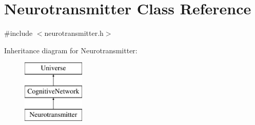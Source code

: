 \hypertarget{classNeurotransmitter}{}\section{Neurotransmitter Class Reference}
\label{classNeurotransmitter}


{\ttfamily \#include $<$neurotransmitter.\+h$>$}

Inheritance diagram for Neurotransmitter\+:\begin{figure}[H]
\begin{center}
\leavevmode
\includegraphics[height=3.000000cm]{classNeurotransmitter}
\end{center}
\end{figure}
